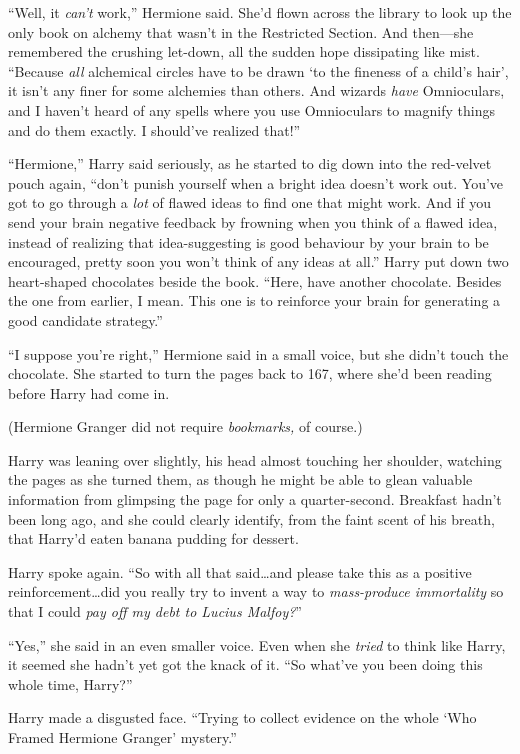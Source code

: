 “Well, it \emph{can’t} work,” Hermione said. She’d flown across the library to look up the only book on alchemy that wasn’t in the Restricted Section. And then—she remembered the crushing let-down, all the sudden hope dissipating like mist. “Because \emph{all} alchemical circles have to be drawn ‘to the fineness of a child’s hair’, it isn’t any finer for some alchemies than others. And wizards \emph{have} Omnioculars, and I haven’t heard of any spells where you use Omnioculars to magnify things and do them exactly. I should’ve realized that!”

“Hermione,” Harry said seriously, as he started to dig down into the red-velvet pouch again, “don’t punish yourself when a bright idea doesn’t work out. You’ve got to go through a \emph{lot} of flawed ideas to find one that might work. And if you send your brain negative feedback by frowning when you think of a flawed idea, instead of realizing that idea-suggesting is good behaviour by your brain to be encouraged, pretty soon you won’t think of any ideas at all.” Harry put down two heart-shaped chocolates beside the book. “Here, have another chocolate. Besides the one from earlier, I mean. This one is to reinforce your brain for generating a good candidate strategy.”

“I suppose you’re right,” Hermione said in a small voice, but she didn’t touch the chocolate. She started to turn the pages back to 167, where she’d been reading before Harry had come in.

(Hermione Granger did not require \emph{bookmarks,} of course.)

Harry was leaning over slightly, his head almost touching her shoulder, watching the pages as she turned them, as though he might be able to glean valuable information from glimpsing the page for only a quarter-second. Breakfast hadn’t been long ago, and she could clearly identify, from the faint scent of his breath, that Harry’d eaten banana pudding for dessert.

Harry spoke again. “So with all that said…and please take this as a positive reinforcement…did you really try to invent a way to \emph{mass-produce immortality} so that I could \emph{pay off my debt to Lucius Malfoy?}”

“Yes,” she said in an even smaller voice. Even when she \emph{tried} to think like Harry, it seemed she hadn’t yet got the knack of it. “So what’ve you been doing this whole time, Harry?”

Harry made a disgusted face. “Trying to collect evidence on the whole ‘Who Framed Hermione Granger’ mystery.”

